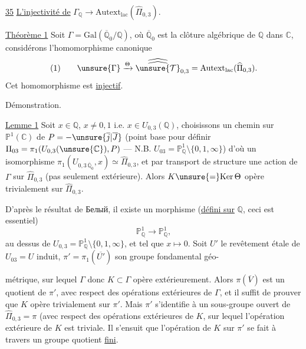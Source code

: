 
\uline{35} \uline{L'injectivité de} $\Gamma_{\mathbb Q}\longrightarrow\mathrm{Autext}_{\mathrm{lac}}(\widehat{\Pi}_{0,3})$.


\uline{Théorème 1} Soit $\Gamma=\mathrm{Gal}(\overline{\mathbb Q}_0/\mathbb Q)$, où $\overline{\mathbb Q}_0$ est la clôture algébrique de $\mathbb Q$ dans $\mathbb C$, considérons l'homomorphisme canonique
\[
(1)\qquad \unsure{\Gamma}\xrightarrow{\Theta}\widehat{\widehat{\unsure{\mathcal T}}}_{0,3}=\mathrm{Autext}_{\mathrm{lac}}(\widehat{\Pi}_{0,3}).
\]
Cet homomorphisme est \uline{injectif}.

Démonstration.

\uline{Lemme 1} Soit $x\in\mathbb Q$, $x\ne0,1$ i.e. $x\in U_{0,3}(\mathbb Q)$, choisissons un  chemin sur $\mathbb P^1(\mathbb C)$ de $P=-\unsure{\overline{j}|\overline{J}}$ (point base pour définir $\Pi_{03}=\pi_1(U_{0,3}(\unsure{\mathbb C}),P)$ --- N.B. $U_{03}=\mathbb P^1_{\mathbb Q}\setminus\{0,1,\infty\}$) d'où un isomorphisme $\pi_1(U_{0,3\,\overline{\mathbb Q}_0},x)\simeq\widehat{\Pi}_{0,3}$, et par transport de structure une action  de $\Gamma$ sur $\widehat{\Pi}_{0,3}$ (pas seulement extérieure). Alors $K\unsure{=}\mathrm{Ker}\,\Theta$ opère trivialement sur $\widehat{\Pi}_{0,3}$.

D'après le résultat de Белый, il existe un morphisme (\uline{défini sur} $\mathbb Q$, ceci est essentiel)
\[
\mathbb P^1_{\mathbb Q}\longrightarrow\mathbb P^1_{\mathbb Q},
\]
 au dessus de $U_{0,3}=\mathbb P^1_{\mathbb Q}\setminus\{0,1,\infty\}$, et tel que $x\longmapsto0$. Soit $U'$ le revêtement étale de $U_{03}=U$ induit,  $\pi'=\pi_1(\overline{U'})$ son groupe fondamental géo-

métrique, sur lequel $\Gamma$ donc $K\subset\Gamma$ opère extérieurement. Alors $\pi(\overline V)$ est un quotient de $\pi'$, avec respect des opérations extérieures de $\Gamma$, et il suffit de prouver que $K$ opère trivialement sur $\pi'$. Mais $\pi'$ s'identifie à un sous-groupe ouvert de $\widehat{\Pi}_{0,3}=\pi$ (avec respect des opérations extérieures de $K$, sur lequel l'opération extérieure de $K$ est triviale. Il s'ensuit que l'opération  de $K$ sur $\pi'$ se fait à travers un groupe quotient \uline{fini}.

